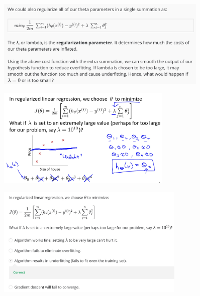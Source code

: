 \documentclass[12pt, A4,onecolumn]{article} %
\begin{document}
\begin{figure}[H]
	\centering
	\includegraphics[width=0.9\textwidth]{./Imagenes/regulCostFunc3}
\end{figure}

\begin{figure}[H]
	\centering
	\includegraphics[width=0.74\textwidth]{./Imagenes/regulCostFunc4}
\end{figure}

\begin{figure}[H]
	\centering
	\includegraphics[width=0.8\textwidth]{./Imagenes/testRegul}
\end{figure}
\end{document}
